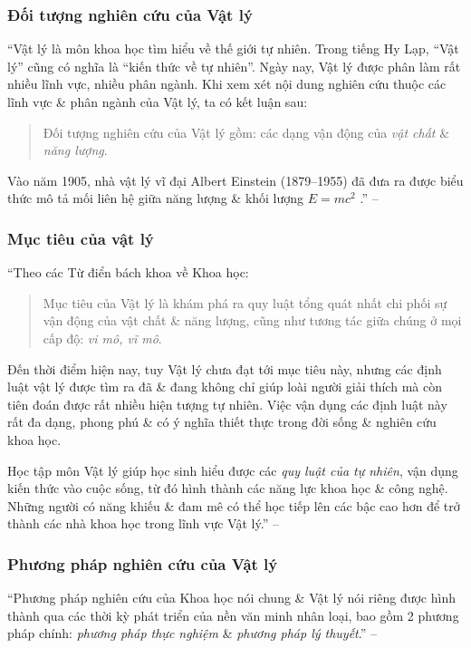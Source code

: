 \documentclass[oneside]{book}
\numberwithin{equation}{section}
\begin{document}
\subsubsection{Đối tượng nghiên cứu của Vật lý}
``Vật lý là môn khoa học tìm hiểu về thế giới tự nhiên. Trong tiếng Hy Lạp, ``Vật lý'' cũng có nghĩa là ``kiến thức về tự nhiên''. Ngày nay, Vật lý được phân làm rất nhiều lĩnh vực, nhiều phân ngành. Khi xem xét nội dung nghiên cứu thuộc các lĩnh vực \& phân ngành của Vật lý, ta có kết luận sau:

\begin{quotation}
	Đối tượng nghiên cứu của Vật lý gồm: các dạng vận động của \textit{vật chất} \& \textit{năng lượng}.
\end{quotation}
Vào năm 1905, nhà vật lý vĩ đại Albert Einstein (1879--1955) đã đưa ra được biểu thức mô tả mối liên hệ giữa năng lượng \& khối lượng $E = mc^2$ \cite[Hình 1.1, p. 5]{SGK_Vat_Ly_10_Chan_Troi_Sang_Tao}.'' -- \cite[p. 5]{SGK_Vat_Ly_10_Chan_Troi_Sang_Tao}

\subsubsection{Mục tiêu của vật lý}
``Theo các Từ điển bách khoa về Khoa học:

\begin{quotation}
	Mục tiêu của Vật lý là khám phá ra quy luật tổng quát nhất chi phối sự vận động của vật chất \& năng lượng, cũng như tương tác giữa chúng ở mọi cấp độ: \textit{vi mô, vĩ mô}.
\end{quotation}
Đến thời điểm hiện nay, tuy Vật lý chưa đạt tới mục tiêu này, nhưng các định luật vật lý được tìm ra đã \& đang không chỉ giúp loài người giải thích mà còn tiên đoán được rất nhiều hiện tượng tự nhiên. Việc vận dụng các định luật này rất đa dạng, phong phú \& có ý nghĩa thiết thực trong đời sống \& nghiên cứu khoa học.

Học tập môn Vật lý giúp học sinh hiểu được các \textit{quy luật của tự nhiên}, vận dụng kiến thức vào cuộc sống, từ đó hình thành các năng lực khoa học \& công nghệ. Những người có năng khiếu \& đam mê có thể học tiếp lên các bậc cao hơn để trở thành các nhà khoa học trong lĩnh vực Vật lý.'' -- \cite[p. 6]{SGK_Vat_Ly_10_Chan_Troi_Sang_Tao}

\subsubsection{Phương pháp nghiên cứu của Vật lý}
``Phương pháp nghiên cứu của Khoa học nói chung \& Vật lý nói riêng được hình thành qua các thời kỳ phát triển của nền văn minh nhân loại, bao gồm 2 phương pháp chính: \textit{phương pháp thực nghiệm} \& \textit{phương pháp lý thuyết}.'' -- \cite[p. 6]{SGK_Vat_Ly_10_Chan_Troi_Sang_Tao}
\end{document}
